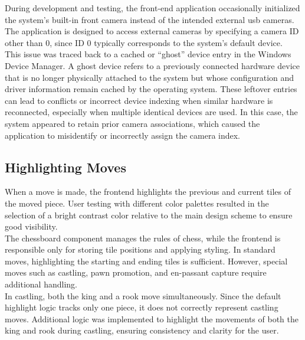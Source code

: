 During development and testing, the front-end application occasionally initialized the system’s built-in front camera instead of the intended external \gls{usb} cameras. The application is designed to access external cameras by specifying a camera ID other than 0, since ID 0 typically corresponds to the system’s default device. \\

This issue was traced back to a cached or “ghost” device entry in the Windows Device Manager. A ghost device refers to a previously connected hardware device that is no longer physically attached to the system but whose configuration and driver information remain cached by the operating system. These leftover entries can lead to conflicts or incorrect device indexing when similar hardware is reconnected, especially when multiple identical devices are used. In this case, the system appeared to retain prior camera associations, which caused the application to misidentify or incorrectly assign the camera index. \\

\subsection{Highlighting Moves}
When a move is made, the frontend highlights the previous and current tiles of the moved piece. User testing with different color palettes resulted in the selection of a bright contrast color relative to the main design scheme to ensure good visibility. \\

The chessboard component manages the rules of chess, while the frontend is responsible only for storing tile positions and applying styling. In standard moves, highlighting the starting and ending tiles is sufficient. However, special moves such as \gls{castling}, pawn \gls{promotion}, and \gls{en-passant} capture require additional handling. \\

In \gls{castling}, both the king and a rook move simultaneously. Since the default highlight logic tracks only one piece, it does not correctly represent \gls{castling} moves. Additional logic was implemented to highlight the movements of both the king and rook during \gls{castling}, ensuring consistency and clarity for the user.





